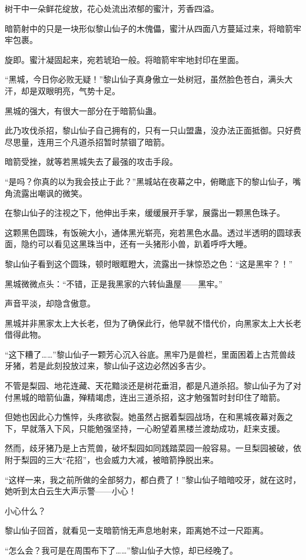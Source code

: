 \begin{this_body}
树干中一朵鲜花绽放，花心处流出浓郁的蜜汁，芳香四溢。

暗箭射中的只是一块形似黎山仙子的木傀儡，蜜汁从四面八方蔓延过来，将暗箭牢牢包裹。

旋即。蜜汁凝固起来，宛若琥珀一般。将暗箭牢牢地封印在里面。

“黑城，今日你必败无疑！”黎山仙子真身傲立一处树冠，虽然脸色苍白，满头大汗，却是双眼明亮，气势十足。

黑城的强大，有很大一部分在于暗箭仙蛊。

此乃攻伐杀招，黎山仙子自己拥有的，只有一只山盟蛊，没办法正面抵御。只好费尽思量，连用三个凡道杀招暂时禁锢了暗箭。

暗箭受挫，就等若黑城失去了最强的攻击手段。

“是吗？你真的以为我会技止于此？”黑城站在夜幕之中，俯瞰底下的黎山仙子，嘴角流露出嘲讽的微笑。

在黎山仙子的注视之下，他伸出手来，缓缓展开手掌，展露出一颗黑色珠子。

这颗黑色圆珠，有饭碗大小，通体黑光崭亮，宛若黑色水晶。透过半透明的圆球表面，隐约可以看见这黑珠当中，还有一头猪形小兽，趴着呼呼大睡。

黎山仙子看到这个圆珠，顿时眼眶瞪大，流露出一抹惊恐之色：“这是黑牢？！”

黑城微微点头：“不错，正是我黑家的六转仙蛊屋——黑牢。”

声音平淡，却隐含傲意。

黑城并非黑家太上大长老，但为了确保此行，他早就不惜代价，向黑家太上大长老借得此物。

“这下糟了……”黎山仙子一颗芳心沉入谷底。黑牢乃是兽栏，里面困着上古荒兽歧牙猪，若是此刻投放过来，黎山仙子这边必然凶多吉少。

不管是梨园、地花连藏、天花黯淡还是树花垂泪，都是凡道杀招。黎山仙子为了对付黑城的暗箭仙蛊，殚精竭虑，连出三道杀招，这才勉强暂时封印住了暗箭。

但她也因此心力憔悴，头疼欲裂。她虽然占据着梨园战场，在和黑城夜幕对轰之下，早就落入下风，只能勉强坚持，一心盼望着黑楼兰渡劫成功，赶来支援。

然而，歧牙猪乃是上古荒兽，破坏梨园如同践踏菜园一般容易。一旦梨园被破，依附于梨园的三大“花招”，也会威力大减，被暗箭挣脱出来。

“这样一来，我之前所做的全部努力，都白费了！”黎山仙子暗暗咬牙，就在这时，她听到太白云生大声示警——小心！

小心什么？

黎山仙子回首，就看见一支暗箭悄无声息地射来，距离她不过一尺距离。

“怎么会？我可是在周围布下了……”黎山仙子大惊，却已经晚了。


\end{this_body}
